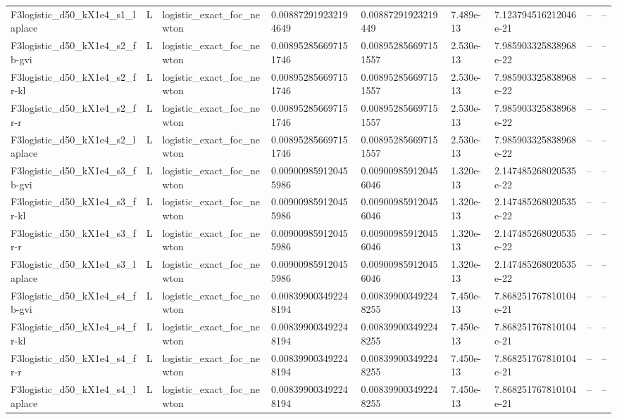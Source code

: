 \begin{tabular}{lllllllll}
F3logistic\_d50\_kX1e4\_s1\_laplace & L & logistic\_exact\_foc\_newton & 0.008872919232194649 & 0.00887291923219449 & 7.489e-13 & 7.123794516212046e-21 & -- & -- \\
F3logistic\_d50\_kX1e4\_s2\_fb-gvi & L & logistic\_exact\_foc\_newton & 0.008952856697151746 & 0.008952856697151557 & 2.530e-13 & 7.985903325838968e-22 & -- & -- \\
F3logistic\_d50\_kX1e4\_s2\_fr-kl & L & logistic\_exact\_foc\_newton & 0.008952856697151746 & 0.008952856697151557 & 2.530e-13 & 7.985903325838968e-22 & -- & -- \\
F3logistic\_d50\_kX1e4\_s2\_fr-r & L & logistic\_exact\_foc\_newton & 0.008952856697151746 & 0.008952856697151557 & 2.530e-13 & 7.985903325838968e-22 & -- & -- \\
F3logistic\_d50\_kX1e4\_s2\_laplace & L & logistic\_exact\_foc\_newton & 0.008952856697151746 & 0.008952856697151557 & 2.530e-13 & 7.985903325838968e-22 & -- & -- \\
F3logistic\_d50\_kX1e4\_s3\_fb-gvi & L & logistic\_exact\_foc\_newton & 0.009009859120455986 & 0.009009859120456046 & 1.320e-13 & 2.147485268020535e-22 & -- & -- \\
F3logistic\_d50\_kX1e4\_s3\_fr-kl & L & logistic\_exact\_foc\_newton & 0.009009859120455986 & 0.009009859120456046 & 1.320e-13 & 2.147485268020535e-22 & -- & -- \\
F3logistic\_d50\_kX1e4\_s3\_fr-r & L & logistic\_exact\_foc\_newton & 0.009009859120455986 & 0.009009859120456046 & 1.320e-13 & 2.147485268020535e-22 & -- & -- \\
F3logistic\_d50\_kX1e4\_s3\_laplace & L & logistic\_exact\_foc\_newton & 0.009009859120455986 & 0.009009859120456046 & 1.320e-13 & 2.147485268020535e-22 & -- & -- \\
F3logistic\_d50\_kX1e4\_s4\_fb-gvi & L & logistic\_exact\_foc\_newton & 0.008399003492248194 & 0.008399003492248255 & 7.450e-13 & 7.868251767810104e-21 & -- & -- \\
F3logistic\_d50\_kX1e4\_s4\_fr-kl & L & logistic\_exact\_foc\_newton & 0.008399003492248194 & 0.008399003492248255 & 7.450e-13 & 7.868251767810104e-21 & -- & -- \\
F3logistic\_d50\_kX1e4\_s4\_fr-r & L & logistic\_exact\_foc\_newton & 0.008399003492248194 & 0.008399003492248255 & 7.450e-13 & 7.868251767810104e-21 & -- & -- \\
F3logistic\_d50\_kX1e4\_s4\_laplace & L & logistic\_exact\_foc\_newton & 0.008399003492248194 & 0.008399003492248255 & 7.450e-13 & 7.868251767810104e-21 & -- & -- \\

\end{tabular}
